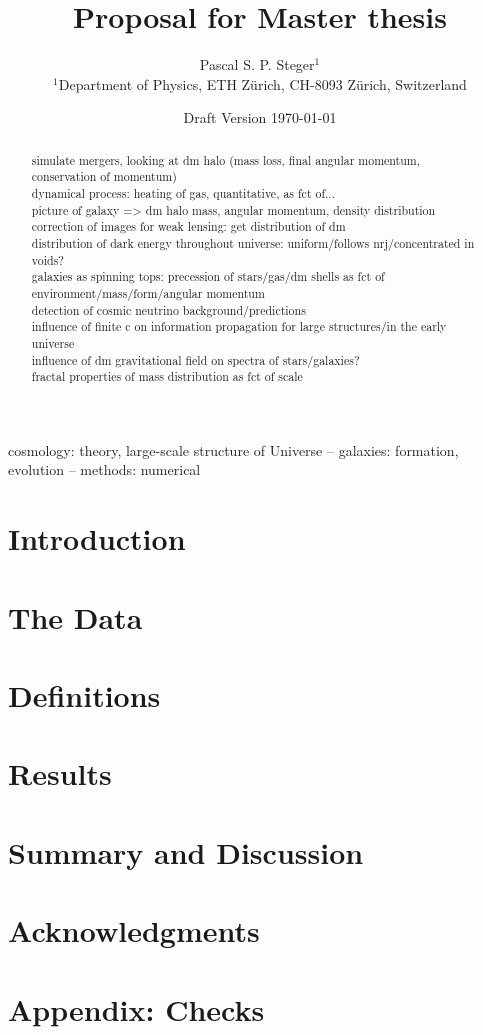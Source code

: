 \documentclass[useAMS,usenatbib]{mn2e}
\begin{document}
% 
\title[Proposal for Master thesis] {Proposal for Master thesis}
\author[P. Steger]  {
  Pascal S. P. Steger$^{1}$\\
  $^{1}$Department of Physics, ETH Z\"urich, CH-8093 Z\"urich,
  Switzerland
}
% 
% 
\date{Draft Version \today}
\pagerange{\pageref{firstpage}--\pageref{lastpage}} 
\maketitle
\label{firstpage}
\begin{abstract}
% 
simulate mergers, looking at dm halo (mass loss, final angular momentum, conservation of momentum)\\
dynamical process: heating of gas, quantitative, as fct of...\\
picture of galaxy => dm halo mass, angular momentum, density distribution\\
correction of images for weak lensing: get distribution of dm\\
distribution of dark energy throughout universe: uniform/follows nrj/concentrated in voids?\\
galaxies as spinning tops: precession of stars/gas/dm shells as fct of environment/mass/form/angular momentum\\
detection of cosmic neutrino background/predictions \\
influence of finite c on information propagation for large structures/in the early universe\\
influence of dm gravitational field on spectra of stars/galaxies?\\
fractal properties of mass distribution as fct of scale\\
% 
\end{abstract}
% 
\begin{keywords}
  cosmology: theory, large-scale structure of Universe --
  galaxies: formation, evolution --
  methods: numerical
\end{keywords}
% 
% 
\section{Introduction}
\label{chap:intro}
% 

% 
\section{The Data}
\label{chap:data}
% 
\section{Definitions}
\label{chap:defs}
% 
\section{Results}
\label{chap:res}
% 
% 
\section{Summary and Discussion}
\label{chap:disc}
% 
% 
\section*{Acknowledgments}
% 
%
\section{Appendix: Checks}
\label{chap:appendix}
% 
%

% 
% 

% 
\label{lastpage}
\end{document}
